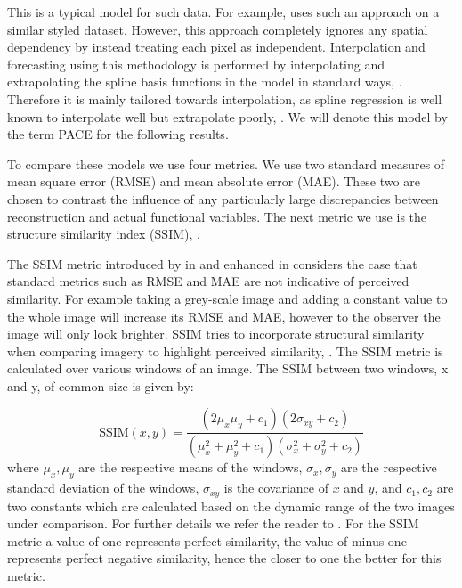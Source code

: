 This is a typical model for such data.
For example, \cite{hooker_maximal_2016} uses such an approach on a similar styled dataset. 
However, this approach completely ignores any spatial dependency by instead treating each pixel as independent.
Interpolation and forecasting using this methodology is performed by interpolating and extrapolating the spline basis functions in the model in standard ways, \citep{de_boor_practical_2001}.
Therefore it is mainly tailored towards interpolation, as spline regression is well known to interpolate well but extrapolate poorly, \citep{de_boor_practical_2001}.
We will denote this model by the term PACE for the following results. 


To compare these models we use four metrics. 
We use two standard measures of mean square error (RMSE) and mean absolute error (MAE).
These two are chosen to contrast the influence of any particularly large discrepancies between reconstruction and actual functional variables. 
The next metric we use is the structure similarity index (SSIM), \citep{wang_image_2004}.

The SSIM metric introduced by \citeauthor{wang_image_2004} in \citeyear{wang_image_2004} and enhanced in \citeyear{wang_mean_2009} considers the case that standard metrics such as RMSE and MAE are not indicative of perceived similarity.
For example taking a grey-scale image and adding a constant value to the whole image will increase its RMSE and MAE, however to the observer the image will only look brighter. 
SSIM tries to incorporate structural similarity when comparing imagery to highlight perceived similarity, \citep{wang_mean_2009}. 
The SSIM metric is calculated over various windows of an image.
The SSIM between two windows, x and y, of common size is given by:

\begin{equation}
	\text{SSIM}\left(x, y\right) = \frac{(2 \mu_x \mu_y + c_1)(2\sigma_{xy} + c_2)}{(\mu_x^2 + \mu_y^2 + c_1)(\sigma_x^2 + \sigma_y^2 + c_2)}
\end{equation}
where $\mu_x, \mu_y$ are the respective means of the windows, $\sigma_x, \sigma_y$ are the respective standard deviation of the windows, $\sigma_{xy}$ is the covariance of $x$ and $y$, and $c_1, c_2$ are two constants which are calculated based on the dynamic range of the two images under comparison.
For further details we refer the reader to \citep{wang_mean_2009}.
For the SSIM metric a value of one represents perfect similarity, the value of minus one represents perfect negative similarity, hence the closer to one the better for this metric.

